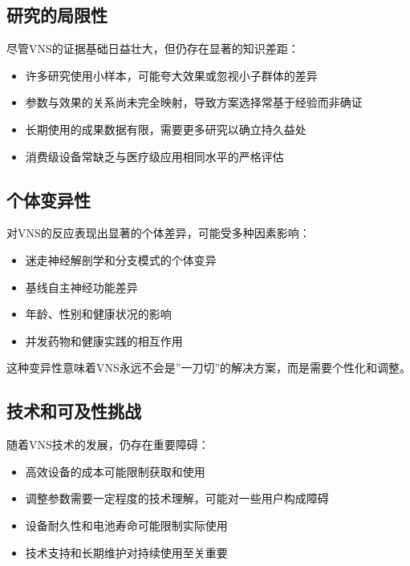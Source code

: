 \documentclass[
  Letterpaper,
]{scrbook}
\providecommand{\tightlist}{%
  \setlength{\itemsep}{0pt}\setlength{\parskip}{0pt}}\usepackage{longtable,booktabs,array}
\begin{document}
\subsection{研究的局限性}\label{ux7814ux7a76ux7684ux5c40ux9650ux6027}

尽管VNS的证据基础日益壮大，但仍存在显著的知识差距：

\begin{itemize}
\tightlist
\item
  许多研究使用小样本，可能夸大效果或忽视小子群体的差异
\item
  参数与效果的关系尚未完全映射，导致方案选择常基于经验而非确证
\item
  长期使用的成果数据有限，需要更多研究以确立持久益处
\item
  消费级设备常缺乏与医疗级应用相同水平的严格评估
\end{itemize}

\subsection{个体变异性}\label{ux4e2aux4f53ux53d8ux5f02ux6027}

对VNS的反应表现出显著的个体差异，可能受多种因素影响：

\begin{itemize}
\tightlist
\item
  迷走神经解剖学和分支模式的个体变异
\item
  基线自主神经功能差异
\item
  年龄、性别和健康状况的影响
\item
  并发药物和健康实践的相互作用
\end{itemize}

这种变异性意味着VNS永远不会是''一刀切''的解决方案，而是需要个性化和调整。

\subsection{技术和可及性挑战}\label{ux6280ux672fux548cux53efux53caux6027ux6311ux6218}

随着VNS技术的发展，仍存在重要障碍：

\begin{itemize}
\tightlist
\item
  高效设备的成本可能限制获取和使用
\item
  调整参数需要一定程度的技术理解，可能对一些用户构成障碍
\item
  设备耐久性和电池寿命可能限制实际使用
\item
  技术支持和长期维护对持续使用至关重要
\end{itemize}
\end{document}
